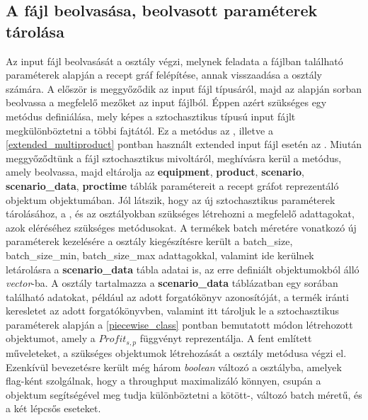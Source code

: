 \subsection{A fájl beolvasása, beolvasott paraméterek tárolása} \label{inputReader}
Az input fájl beolvasását a  osztály végzi, melynek feladata a fájlban található paraméterek alapján a recept gráf felépítése, annak visszaadása a osztály számára.
A  először is meggyőződik az input fájl típusáról, majd az alapján sorban beolvassa a megfelelő mezőket az input fájlból.
Éppen azért szükséges egy metódus definiálása, mely képes a sztochasztikus típusú input fájlt megkülönböztetni a többi fajtától.
Ez a metódus az , illetve a \ref{extended_multiproduct} pontban használt extended input fájl esetén az .
Miután meggyőződtünk a fájl sztochasztikus mivoltáról, meghívásra kerül a  metódus, amely beolvassa, majd eltárolja az \textbf{equipment}, \textbf{product}, \textbf{scenario}, \textbf{scenario\_data}, \textbf{proctime} táblák paramétereit a recept gráfot reprezentáló  objektum  objektumában.
Jól látszik, hogy az új sztochasztikus paraméterek tárolásához, a , és az  osztályokban szükséges létrehozni a megfelelő adattagokat, azok eléréséhez szükséges metódusokat.
A termékek batch méretére vonatkozó új paraméterek kezelésére a  osztály kiegészítésre került a batch\_size, batch\_size\_min, batch\_size\_max adattagokkal, valamint ide kerülnek letárolásra a \textbf{scenario\_data} tábla adatai is, az erre definiált  objektumokból álló \textit{vector}-ba.
A  osztály tartalmazza a \textbf{scenario\_data} táblázatban egy sorában található adatokat, például az adott forgatókönyv azonosítóját, a termék iránti keresletet az adott forgatókönyvben, valamint itt tároljuk le a sztochasztikus paraméterek alapján a \ref{piecewise_class} pontban bemutatott módon létrehozott  objektumot, amely a $Profit_{s,p}$ függvényt reprezentálja.
A fent említett műveleteket, a szükséges objektumok létrehozását a  osztály  metódusa végzi el.
Ezenkívül bevezetésre került még három \textit{boolean} változó a  osztályba,  amelyek flag-ként szolgálnak, hogy a throughput maximalizáló könnyen, csupán a  objektum segítségével meg tudja különböztetni a kötött-, változó batch méretű, és a két lépcsős eseteket.
